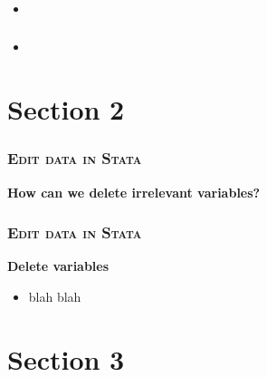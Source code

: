 \documentclass[10pt]{beamer}
\begin{document}
	\begin{frame}
\frametitle{\textsc{}}
\begin{center}
	\Large\textbf{}
\end{center}
\begin{itemize}
	\item
\end{itemize}
\end{frame}

	\begin{frame}
\frametitle{\textsc{}}
\begin{center}
	\Large\textbf{}
\end{center}
\begin{itemize}
	\item
\end{itemize}
\end{frame}
		
\section{Section 2}

	\begin{frame}
		\frametitle{\textsc{Edit data in Stata}}
		\begin{center}
			\textbf{How can we delete irrelevant variables?}
		\end{center}
	\end{frame}

	\begin{frame}[fragile]
		\frametitle{\textsc{Edit data in Stata}}
		\begin{center}
		\Large\textbf{Delete variables}
		\end{center}
		\begin{itemize}
		\item blah blah
		\end{itemize}
		\begin{stlog}\end{stlog}

\begin{stlog}\end{stlog}
	\end{frame}


	\section{Section 3}

	
\end{document}
